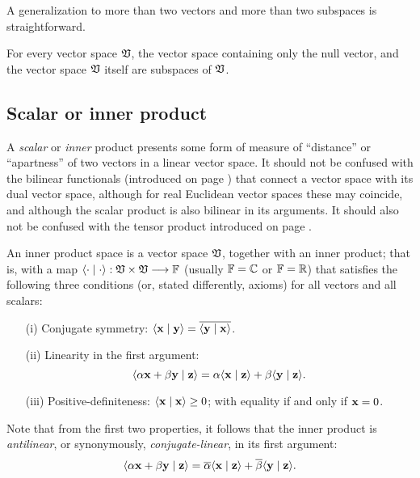 A generalization to more than two vectors and more than two subspaces is straightforward.


For every vector space ${\frak V}$, the vector space containing only the null vector,
 and the vector space ${\frak V}$ itself are subspaces of ${\frak V}$.

\subsection{Scalar or inner product}
\label{2011-m-scalarproduct}

A {\em scalar} or {\em inner} product presents some form of measure of ``distance'' or ``apartness''
of two vectors in a linear vector space.
It should not be confused with the bilinear functionals (introduced on page \pageref{2011-m-dvs}) that connect a vector space with its dual vector space,
although for real Euclidean vector spaces these may coincide,
and although the scalar product is also bilinear in its arguments.
It should also not be confused with the tensor product introduced on page \pageref{2011-m-tensorp}.

An inner product space is a vector space $\frak V$,
together with an inner product; that is, with a map
 $\langle \cdot \mid \cdot \rangle :  \frak V  \times  \frak V  \longrightarrow {\Bbb F}$
 (usually ${\Bbb F}={\Bbb C}$ or ${\Bbb F}={\Bbb R}$)
 that satisfies the following three conditions (or, stated differently, axioms) for all vectors  and all scalars:
\begin{itemize}
\item[(i)]
Conjugate symmetry:
$
\langle {\bf x}\mid {\bf y}\rangle
=
\overline{\langle {\bf y}\mid {\bf x}\rangle }$.
\item[(ii)]
Linearity in the first argument:
$$
\langle  \alpha{\bf x} + \beta {\bf y}  \mid {\bf z}\rangle
=
\alpha {\langle {\bf x}\mid {\bf z}\rangle}
+
\beta {\langle {\bf y}\mid {\bf z}\rangle}
.
$$

\item[(iii)]
Positive-definiteness:
$
\langle {\bf x}\mid {\bf x}\rangle
\ge
0$;  with equality if and only if ${\bf x} = 0$.
\end{itemize}

 Note that from the first two properties, it follows that the inner product is
{\em antilinear}, or synonymously,
{\em conjugate-linear}, in its first argument:
 $$
 \langle \alpha {\bf x} + \beta {\bf y} \mid {\bf z}\rangle
 =
 \overline{\alpha} {\langle {\bf x}\mid {\bf z}\rangle}
 +\overline{\beta} {\langle {\bf y}\mid {\bf z}\rangle}
.
 $$



